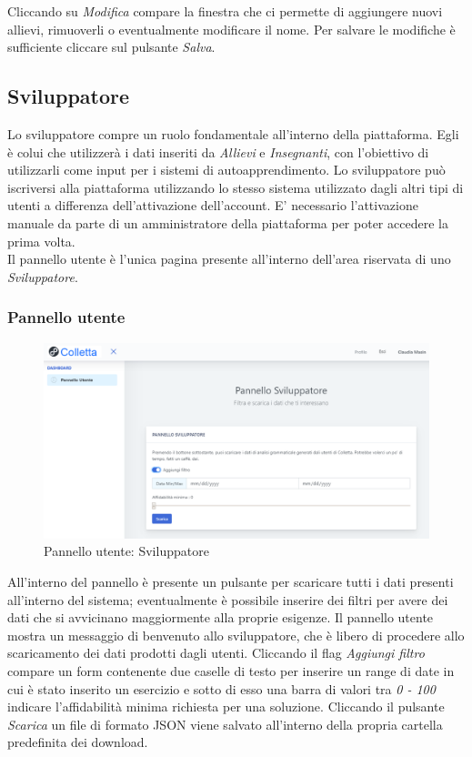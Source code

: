         	
Cliccando su \textit{Modifica} compare la finestra che ci permette di aggiungere nuovi allievi, rimuoverli o eventualmente modificare il nome. Per salvare le modifiche è sufficiente cliccare sul pulsante \textit{Salva}.
        
	\newpage
    \subsection{Sviluppatore}
    Lo sviluppatore compre un ruolo fondamentale all'interno della piattaforma. Egli è colui che utilizzerà i dati inseriti da \textit{Allievi} e \textit{Insegnanti}, con l'obiettivo di utilizzarli come input per i sistemi di autoapprendimento.
    Lo sviluppatore può iscriversi alla piattaforma utilizzando lo stesso sistema utilizzato dagli altri tipi di utenti a differenza dell'attivazione dell'account. E' necessario l'attivazione manuale da parte di un amministratore della piattaforma per poter accedere la prima volta. 
        	 \\Il pannello utente è l'unica pagina presente all'interno dell'area riservata di uno \textit{Sviluppatore}.
   
    	\subsubsection{Pannello utente}
    				\begin{figure}[H]
				\centering
				\includegraphics[width=17cm]{sez/img/sviluppatore/panelloutente.PNG}
				\caption{Pannello utente: Sviluppatore}\label{fig:1}
			\end{figure}
			 All'interno del pannello è presente un pulsante per scaricare tutti i dati presenti all'interno del sistema; eventualmente è possibile inserire dei filtri per avere dei dati che si avvicinano maggiormente alla proprie esigenze.
    	  Il pannello utente mostra un messaggio di benvenuto allo sviluppatore, che è libero di procedere allo scaricamento dei dati prodotti dagli utenti.
    	 Cliccando il flag \textit{Aggiungi filtro} compare un form contenente due caselle di testo per inserire un range di date in cui è stato inserito un esercizio e sotto di esso una barra di valori tra \textit{0 - 100} indicare l'affidabilità minima richiesta per una soluzione.
    	 Cliccando il pulsante \textit{Scarica} un file di formato {JSON} viene salvato all'interno della propria cartella predefinita dei download.

